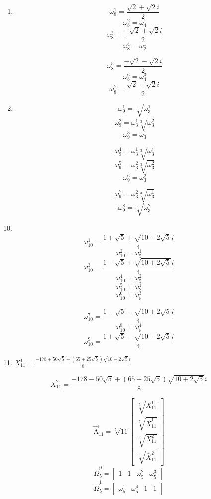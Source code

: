 \documentclass{article}
\begin{document}
\begin{enumerate}
\[ \omega_{7}^{3}=\frac{-1+\vec{\Omega}_{3}^{1}\cdot\vec{\mathrm{A}}_{7}+\sqrt{21-3\vec{\Omega}_{3}^{0}\cdot\vec{\mathrm{A}}_{7}}i}{6} \]
\[ \omega_{7}^{4}=\frac{-1+\vec{\Omega}_{3}^{1}\cdot\vec{\mathrm{A}}_{7}-\sqrt{21-3\vec{\Omega}_{3}^{0}\cdot\vec{\mathrm{A}}_{7}}i}{6} \]

\[ \omega_{7}^{5}=\frac{-1+\vec{\Omega}_{3}^{2}\cdot\vec{\mathrm{A}}_{7}-\sqrt{21-3\vec{\Omega}_{3}^{1}\cdot\vec{\mathrm{A}}_{7}}i}{6} \]
\[ \omega_{7}^{6}=\frac{-1+\vec{\Omega}_{3}^{0}\cdot\vec{\mathrm{A}}_{7}-\sqrt{21-3\vec{\Omega}_{3}^{2}\cdot\vec{\mathrm{A}}_{7}}i}{6} \]

\item \[ \omega_{8}^{1}=\frac{\sqrt{2}+\sqrt{2}i}{2} \]
\[ \omega_{8}^{2}=\omega_{4}^{1} \]
\[ \omega_{8}^{3}=\frac{-\sqrt{2}+\sqrt{2}i}{2} \]
\[ \omega_{8}^{4}=\omega_{2}^{1} \]

\[ \omega_{8}^{5}=\frac{-\sqrt{2}-\sqrt{2}i}{2} \]
\[ \omega_{8}^{6}=\omega_{4}^{3} \]
\[ \omega_{8}^{7}=\frac{\sqrt{2}-\sqrt{2}i}{2} \]

\item \[ \omega_{9}^{1}=\sqrt[3]{\omega_{3}^{1}} \]
\[ \omega_{9}^{2}=\omega_{3}^{1}\sqrt[3]{\omega_{3}^{2}} \]
\[ \omega_{9}^{3}=\omega_{3}^{1} \]

\[ \omega_{9}^{4}=\omega_{3}^{1}\sqrt[3]{\omega_{3}^{1}} \]
\[ \omega_{9}^{5}=\omega_{3}^{2}\sqrt[3]{\omega_{3}^{2}} \]
\[ \omega_{9}^{6}=\omega_{3}^{2} \]

\[ \omega_{9}^{7}=\omega_{3}^{2}\sqrt[3]{\omega_{3}^{1}} \]
\[ \omega_{9}^{8}=\sqrt[3]{\omega_{3}^{2}} \]

\end{enumerate}

10.
\[ \omega_{10}^{1}=\frac{1+\sqrt{5}+\sqrt{10-2\sqrt{5}}i}{4} \]
\[ \omega_{10}^{2}=\omega_{5}^{1} \]
\[ \omega_{10}^{3}=\frac{1-\sqrt{5}+\sqrt{10+2\sqrt{5}}i}{4} \]
\[ \omega_{10}^{4}=\omega_{5}^{2} \]
\[ \omega_{10}^{5}=\omega_{2}^{1} \]
\[ \omega_{10}^{6}=\omega_{5}^{3} \]

\[ \omega_{10}^{7}=\frac{1-\sqrt{5}-\sqrt{10+2\sqrt{5}}i}{4} \]
\[ \omega_{10}^{8}=\omega_{5}^{4} \]
\[ \omega_{10}^{9}=\frac{1+\sqrt{5}-\sqrt{10-2\sqrt{5}}i}{4} \]

11. $X_{11}^{1}=\frac{-178+50\sqrt{5}+(65+25\sqrt{5})\sqrt{10-2\sqrt{5}}i}{8}$

\[ X_{11}^{2}=\frac{-178-50\sqrt{5}+(65-25\sqrt{5})\sqrt{10+2\sqrt{5}}i}{8} \]

\[ \vec{\mathrm{A}}_{11}=\sqrt[5]{11}\left[ \begin{matrix} \sqrt[5]{X_{11}^{1}} \\ \sqrt[5]{\bar{X}_{11}^{1}} \\ \sqrt[5]{X_{11}^{2}} \\ \sqrt[5]{\bar{X}_{11}^{2}} \end{matrix} \right] \]
\[ \vec{\Omega}_{5}^{0}=\left[ \begin{matrix} 1 & 1 & \omega_{5}^{2} & \omega_{5}^{3} \end{matrix} \right] \]
\[ \vec{\Omega}_{5}^{1}=\left[ \begin{matrix} \omega_{5}^{1} & \omega_{5}^{4} & 1 & 1 \end{matrix} \right] \]
\end{document}
